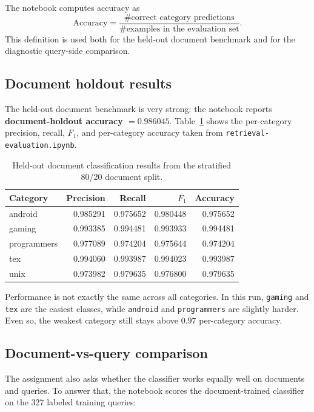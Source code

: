 \documentclass[11pt,a4paper]{article}
\begin{document}
The notebook computes accuracy as
\[
\text{Accuracy} = \frac{\# \text{correct category predictions}}{\# \text{examples in the evaluation set}}.
\]
This definition is used both for the held-out document benchmark and for the diagnostic query-side comparison.

\subsection{Document holdout results}

The held-out document benchmark is very strong: the notebook reports \textbf{document-holdout accuracy \(=0.986045\)}. Table~\ref{tab:clfresults} shows the per-category precision, recall, \(F_1\), and per-category accuracy taken from \texttt{retrieval-evaluation.ipynb}.

\begin{table}[H]
\centering
\scriptsize
\begin{tabular}{l r r r r}
\toprule
Category & Precision & Recall & \(F_1\) & Accuracy \\
\midrule
android & 0.985291 & 0.975652 & 0.980448 & 0.975652 \\
gaming & 0.993385 & 0.994481 & 0.993933 & 0.994481 \\
programmers & 0.977089 & 0.974204 & 0.975644 & 0.974204 \\
tex & 0.994060 & 0.993987 & 0.994023 & 0.993987 \\
unix & 0.973982 & 0.979635 & 0.976800 & 0.979635 \\
\bottomrule
\end{tabular}
\caption{Held-out document classification results from the stratified 80/20 document split.}
\label{tab:clfresults}
\end{table}

Performance is not exactly the same across all categories. In this run, \texttt{gaming} and \texttt{tex} are the easiest classes, while \texttt{android} and \texttt{programmers} are slightly harder. Even so, the weakest category still stays above \(0.97\) per-category accuracy.

\subsection{Document-vs-query comparison}

The assignment also asks whether the classifier works equally well on documents and queries. To answer that, the notebook scores the document-trained classifier on the 327 labeled training queries:
\end{document}
